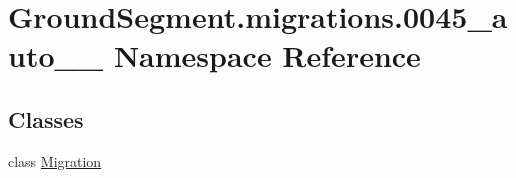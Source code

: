 \hypertarget{namespace_ground_segment_1_1migrations_1_10045__auto__20170206__1323}{}\section{Ground\+Segment.\+migrations.0045\+\_\+auto\+\_\+\_ Namespace Reference}
\label{namespace_ground_segment_1_1migrations_1_10045__auto__20170206__1323}
\subsection*{Classes}
\begin{DoxyCompactItemize}
\item 
class \hyperlink{class_ground_segment_1_1migrations_1_10045__auto__20170206__1323_1_1_migration}{Migration}
\end{DoxyCompactItemize}
